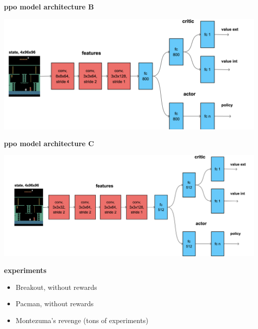 \documentclass[xcolor=dvipsnames]{beamer}
\begin{document}
\begin{frame}{\bf ppo model architecture B}

\centering
\includegraphics[scale=0.1]{../diagrams/rnd/modelppob.png}

\end{frame}


\begin{frame}{\bf ppo model architecture C}

\centering
\includegraphics[scale=0.12]{../diagrams/rnd/modelppoc.png}

\end{frame}



\begin{frame}{\bf experiments}

  \begin{itemize}
    \item Breakout, without rewards
    \item Pacman, without rewards
    \item Montezuma's revenge (tons of experiments)
  \end{itemize}

\end{frame}
\end{document}
